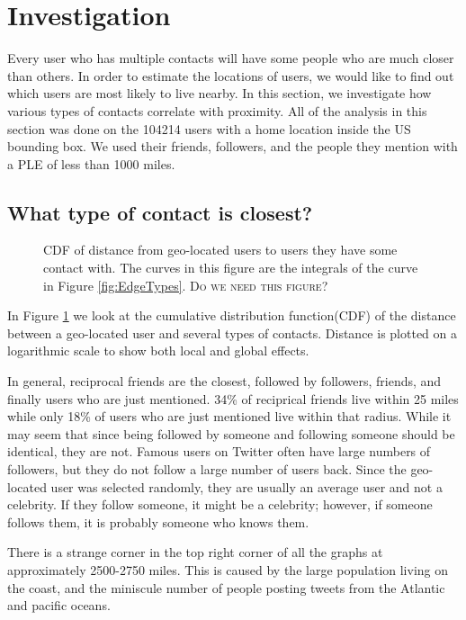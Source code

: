\documentclass{sig-alternate}
\begin{document}
\section{Investigation}
Every user who has multiple contacts will have some people who are much
closer than others. In order to estimate the locations of users, we would like
to find out which users are most likely to live nearby.  In this section, we
investigate how various types of contacts correlate with proximity.
All of the analysis in this section was done on the 104214 users with a home
location inside the US bounding box. We used their friends, followers, and the
people they mention with a PLE of less than 1000 miles.

\subsection{What type of contact is closest?}
\begin{figure}
\centering
{}
\caption{
CDF of distance from geo-located users to users they have some contact
with.
The curves in this figure are the integrals of the curve in Figure \ref{fig:EdgeTypes}.
\textsc{Do we need this figure?}
}
\label{fig:EdgeTypesCum}
\end{figure}
In Figure \ref{fig:EdgeTypesCum} we look at the cumulative distribution
function(CDF) of the distance between a geo-located user and several types of
contacts.
Distance is plotted on a logarithmic scale to show both local and
global effects.

In general, reciprocal friends are the closest, followed by followers, friends,
and finally users who are just mentioned.
34\% of reciprical friends live within 25 miles while only 18\% of users who are
just mentioned live within that radius.
While it may seem that since being followed by someone and following someone
should be identical, they are not.
Famous users on Twitter often have large numbers of followers, but they do not
follow a large number of users back.
Since the geo-located user was selected randomly, they are usually an average
user and not a celebrity.
If they follow someone, it might be a celebrity; however, if someone follows
them, it is probably someone who knows them.

There is a strange corner in the top right corner of all the graphs at
approximately 2500-2750 miles. This is caused by the large population living on the
coast, and the miniscule number of people posting tweets from the Atlantic and
pacific oceans.
\end{document}
